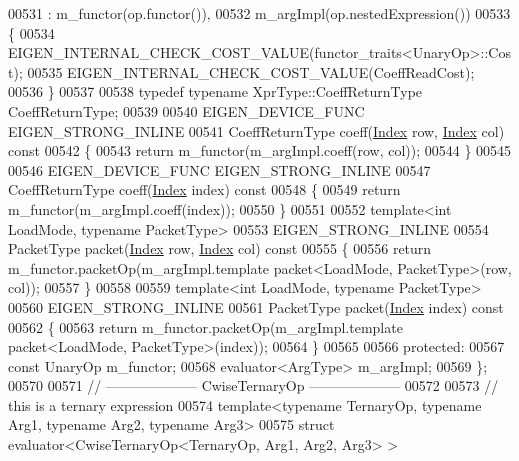 \begin{DoxyCode}
00531     : m\_functor(op.functor()), 
00532       m\_argImpl(op.nestedExpression()) 
00533   \{
00534     EIGEN\_INTERNAL\_CHECK\_COST\_VALUE(functor\_traits<UnaryOp>::Cost);
00535     EIGEN\_INTERNAL\_CHECK\_COST\_VALUE(CoeffReadCost);
00536   \}
00537 
00538   \textcolor{keyword}{typedef} \textcolor{keyword}{typename} XprType::CoeffReturnType CoeffReturnType;
00539 
00540   EIGEN\_DEVICE\_FUNC EIGEN\_STRONG\_INLINE
00541   CoeffReturnType coeff(\hyperlink{namespace_eigen_a62e77e0933482dafde8fe197d9a2cfde}{Index} row, \hyperlink{namespace_eigen_a62e77e0933482dafde8fe197d9a2cfde}{Index} col)\textcolor{keyword}{ const}
00542 \textcolor{keyword}{  }\{
00543     \textcolor{keywordflow}{return} m\_functor(m\_argImpl.coeff(row, col));
00544   \}
00545 
00546   EIGEN\_DEVICE\_FUNC EIGEN\_STRONG\_INLINE
00547   CoeffReturnType coeff(\hyperlink{namespace_eigen_a62e77e0933482dafde8fe197d9a2cfde}{Index} index)\textcolor{keyword}{ const}
00548 \textcolor{keyword}{  }\{
00549     \textcolor{keywordflow}{return} m\_functor(m\_argImpl.coeff(index));
00550   \}
00551 
00552   \textcolor{keyword}{template}<\textcolor{keywordtype}{int} LoadMode, \textcolor{keyword}{typename} PacketType>
00553   EIGEN\_STRONG\_INLINE
00554   PacketType packet(\hyperlink{namespace_eigen_a62e77e0933482dafde8fe197d9a2cfde}{Index} row, \hyperlink{namespace_eigen_a62e77e0933482dafde8fe197d9a2cfde}{Index} col)\textcolor{keyword}{ const}
00555 \textcolor{keyword}{  }\{
00556     \textcolor{keywordflow}{return} m\_functor.packetOp(m\_argImpl.template packet<LoadMode, PacketType>(row, col));
00557   \}
00558 
00559   \textcolor{keyword}{template}<\textcolor{keywordtype}{int} LoadMode, \textcolor{keyword}{typename} PacketType>
00560   EIGEN\_STRONG\_INLINE
00561   PacketType packet(\hyperlink{namespace_eigen_a62e77e0933482dafde8fe197d9a2cfde}{Index} index)\textcolor{keyword}{ const}
00562 \textcolor{keyword}{  }\{
00563     \textcolor{keywordflow}{return} m\_functor.packetOp(m\_argImpl.template packet<LoadMode, PacketType>(index));
00564   \}
00565 
00566 \textcolor{keyword}{protected}:
00567   \textcolor{keyword}{const} UnaryOp m\_functor;
00568   evaluator<ArgType> m\_argImpl;
00569 \};
00570 
00571 \textcolor{comment}{// -------------------- CwiseTernaryOp --------------------}
00572 
00573 \textcolor{comment}{// this is a ternary expression}
00574 \textcolor{keyword}{template}<\textcolor{keyword}{typename} TernaryOp, \textcolor{keyword}{typename} Arg1, \textcolor{keyword}{typename} Arg2, \textcolor{keyword}{typename} Arg3>
00575 \textcolor{keyword}{struct }evaluator<CwiseTernaryOp<TernaryOp, Arg1, Arg2, Arg3> >

\end{DoxyCode}
